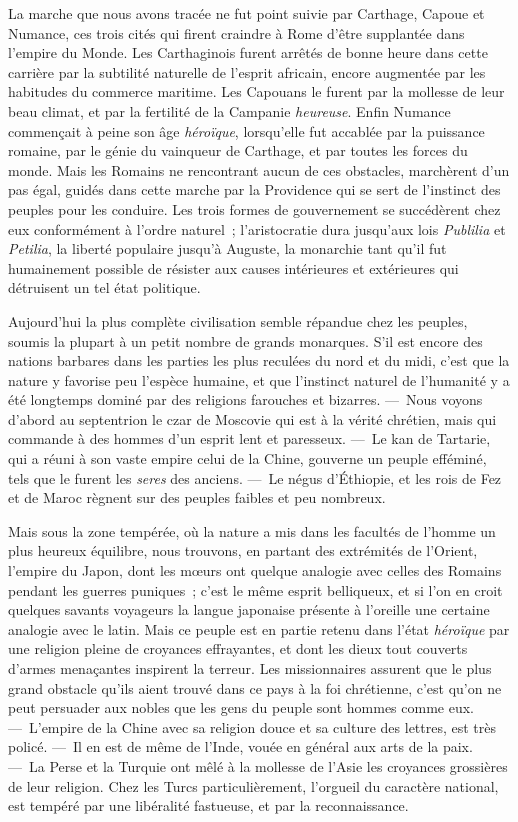\documentclass[french,twoside]{book} %
\newcommand\chaptercont{} %
\begin{document}
\chaptercont
\noindent  La marche que nous avons tracée ne fut point suivie par Carthage, Capoue et Numance, ces trois cités qui firent craindre à Rome d’être supplantée dans l’empire du Monde. Les Carthaginois furent arrêtés de bonne heure dans cette carrière par la subtilité naturelle de l’esprit africain, encore augmentée par les habitudes du commerce maritime. Les Capouans le furent par la mollesse de leur beau climat, et par la fertilité de la Campanie {\itshape heureuse}. Enfin Numance commençait à peine son âge {\itshape héroïque}, lorsqu’elle fut accablée par la puissance romaine, par le génie du vainqueur de Carthage, et par toutes les forces du monde. Mais les Romains ne rencontrant aucun de ces obstacles, marchèrent d’un pas égal, guidés dans cette marche par la Providence qui se sert de l’instinct des peuples pour les conduire. Les trois formes de gouvernement se succédèrent chez eux conformément à l’ordre naturel ; l’aristocratie dura jusqu’aux lois {\itshape Publilia} et {\itshape Petilia}, la liberté populaire jusqu’à Auguste, la  monarchie tant qu’il fut humainement possible de résister aux causes intérieures et extérieures qui détruisent un tel état politique.\par
Aujourd’hui la plus complète civilisation semble répandue chez les peuples, soumis la plupart à un petit nombre de grands monarques. S’il est encore des nations barbares dans les parties les plus reculées du nord et du midi, c’est que la nature y favorise peu l’espèce humaine, et que l’instinct naturel de l’humanité y a été longtemps dominé par des religions farouches et bizarres. — Nous voyons d’abord au septentrion le czar de Moscovie qui est à la vérité chrétien, mais qui commande à des hommes d’un esprit lent et paresseux. — Le kan de Tartarie, qui a réuni à son vaste empire celui de la Chine, gouverne un peuple efféminé, tels que le furent les {\itshape seres} des anciens. — Le négus d’Éthiopie, et les rois de Fez et de Maroc règnent sur des peuples faibles et peu nombreux.\par
Mais sous la zone tempérée, où la nature a mis dans les facultés de l’homme un plus heureux équilibre, nous trouvons, en partant des extrémités de l’Orient, l’empire du Japon, dont les mœurs ont quelque analogie avec celles des Romains pendant les guerres puniques ; c’est le même esprit belliqueux, et si l’on en croit quelques savants voyageurs la langue japonaise présente à l’oreille une certaine analogie avec le latin. Mais ce peuple est en partie retenu dans l’état {\itshape héroïque} par une religion  pleine de croyances effrayantes, et dont les dieux tout couverts d’armes menaçantes inspirent la terreur. Les missionnaires assurent que le plus grand obstacle qu’ils aient trouvé dans ce pays à la foi chrétienne, c’est qu’on ne peut persuader aux nobles que les gens du peuple sont hommes comme eux. — L’empire de la Chine avec sa religion douce et sa culture des lettres, est très policé. — Il en est de même de l’Inde, vouée en général aux arts de la paix. — La Perse et la Turquie ont mêlé à la mollesse de l’Asie les croyances grossières de leur religion. Chez les Turcs particulièrement, l’orgueil du caractère national, est tempéré par une libéralité fastueuse, et par la reconnaissance.\par
\end{document}

